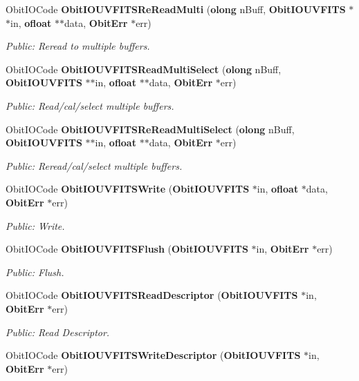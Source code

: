 \begin{CompactItemize}
Obit\-IOCode {\bf Obit\-IOUVFITSRe\-Read\-Multi} ({\bf olong} n\-Buff, {\bf Obit\-IOUVFITS} $\ast$$\ast$in, {\bf ofloat} $\ast$$\ast$data, {\bf Obit\-Err} $\ast$err)
\begin{CompactList}\small\item\em Public: Reread to multiple buffers. \item\end{CompactList}\item 
Obit\-IOCode {\bf Obit\-IOUVFITSRead\-Multi\-Select} ({\bf olong} n\-Buff, {\bf Obit\-IOUVFITS} $\ast$$\ast$in, {\bf ofloat} $\ast$$\ast$data, {\bf Obit\-Err} $\ast$err)
\begin{CompactList}\small\item\em Public: Read/cal/select multiple buffers. \item\end{CompactList}\item 
Obit\-IOCode {\bf Obit\-IOUVFITSRe\-Read\-Multi\-Select} ({\bf olong} n\-Buff, {\bf Obit\-IOUVFITS} $\ast$$\ast$in, {\bf ofloat} $\ast$$\ast$data, {\bf Obit\-Err} $\ast$err)
\begin{CompactList}\small\item\em Public: Reread/cal/select multiple buffers. \item\end{CompactList}\item 
Obit\-IOCode {\bf Obit\-IOUVFITSWrite} ({\bf Obit\-IOUVFITS} $\ast$in, {\bf ofloat} $\ast$data, {\bf Obit\-Err} $\ast$err)
\begin{CompactList}\small\item\em Public: Write. \item\end{CompactList}\item 
Obit\-IOCode {\bf Obit\-IOUVFITSFlush} ({\bf Obit\-IOUVFITS} $\ast$in, {\bf Obit\-Err} $\ast$err)
\begin{CompactList}\small\item\em Public: Flush. \item\end{CompactList}\item 
Obit\-IOCode {\bf Obit\-IOUVFITSRead\-Descriptor} ({\bf Obit\-IOUVFITS} $\ast$in, {\bf Obit\-Err} $\ast$err)
\begin{CompactList}\small\item\em Public: Read Descriptor. \item\end{CompactList}\item 
Obit\-IOCode {\bf Obit\-IOUVFITSWrite\-Descriptor} ({\bf Obit\-IOUVFITS} $\ast$in, {\bf Obit\-Err} $\ast$err)

\end{CompactItemize}

